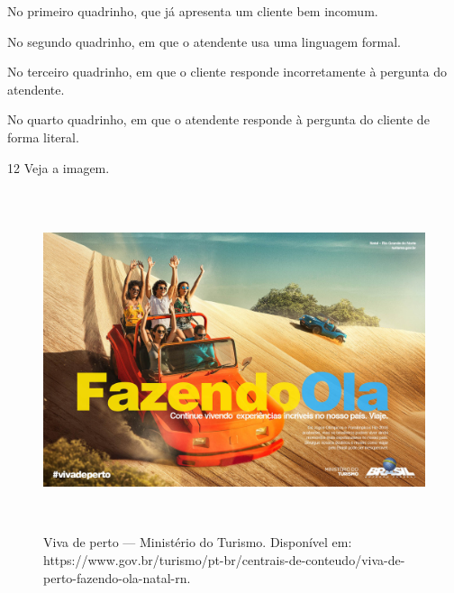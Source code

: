 \begin{escolha}
\item
  No primeiro quadrinho, que já apresenta um cliente bem incomum.
\item
  No segundo quadrinho, em que o atendente usa uma linguagem formal.
\item
  No terceiro quadrinho, em que o cliente responde incorretamente à
  pergunta do atendente.
\item
  No quarto quadrinho, em que o atendente responde à pergunta do cliente
  de forma literal.
\end{escolha}



\num{12} Veja a imagem.

\begin{figure}[H]
\centering\includegraphics[width=5.90556in,height=3.93403in]{./imgSAEB_6_POR/media/image43.jpeg}
\caption{Viva de perto --- Ministério do Turismo. Disponível em: https://www.gov.br/turismo/pt-br/centrais-de-conteudo/viva-de-perto-fazendo-ola-natal-rn.}
\end{figure}


